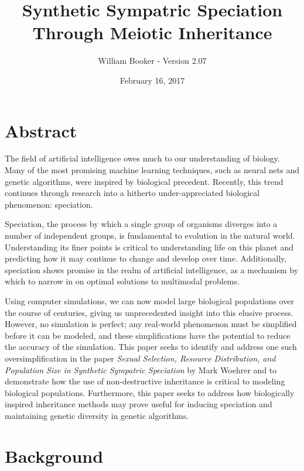 \documentclass{article}
\title{Synthetic Sympatric Speciation Through Meiotic Inheritance}
\author{William Booker - Version 2.07}
\date{February 16, 2017}
\newcommand\TODO[1]{\textcolor{red}{#1}}
\begin{document}
\maketitle


\section{Abstract}

The field of artificial intelligence owes much to our understanding of biology. Many of the most promising machine learning techniques, such as neural nets and genetic algorithms, were inspired by biological precedent. Recently, this trend continues through research into a hitherto under-appreciated biological phenomenon: speciation.

Speciation, the process by which a single group of organisms diverges into a number of independent groups, is fundamental to evolution in the natural world. Understanding its finer points is critical to understanding life on this planet and predicting how it may continue to change and develop over time. Additionally, speciation shows promise in the realm of artificial intelligence, as a mechanism by which to narrow in on optimal solutions to multimodal problems.

Using computer simulations, we can now model large biological populations over the course of centuries, giving us unprecedented insight into this elusive process. However, no simulation is perfect; any real-world phenomenon must be simplified before it can be modeled, and these simplifications have the potential to reduce the accuracy of the simulation. This paper seeks to identify and address one such oversimplification in the paper \textit{Sexual Selection, Resource Distribution, and Population Size in Synthetic Sympatric Speciation} by Mark Woehrer and  to demonstrate how the use of non-destructive inheritance is critical to modeling biological populations. Furthermore, this paper seeks to address how biologically inspired inheritance methods may prove useful for inducing speciation and maintaining genetic diversity in genetic algorithms.



\section{Background}
\end{document}
